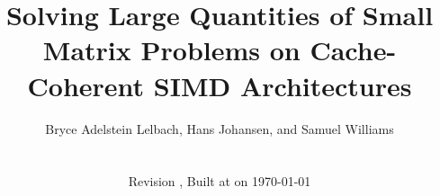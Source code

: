 \documentclass{sig-alternate-05-2015}
\begin{document}
\title{Solving Large Quantities of Small Matrix Problems on Cache-Coherent SIMD Architectures}

\author{
\alignauthor
Bryce Adelstein Lelbach, Hans Johansen, and Samuel Williams\\
\\
\\
{\small Revision \gitAbbrevHash \gitReferences, Built at \currenttime \vspace{1ex} on \today}
}


% 
\end{document}
